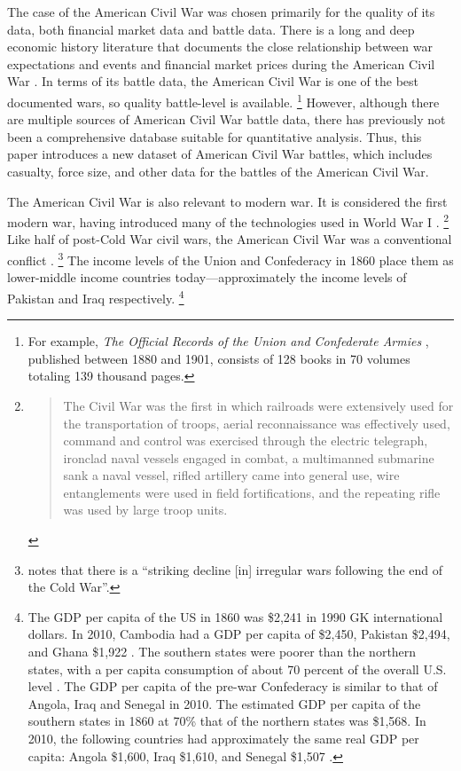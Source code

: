 \documentclass[11pt, oneside, article]{memoir}
\begin{document}
The case of the American Civil War was chosen primarily for the quality of its data, both financial market data and battle data.
There is a long and deep economic history literature that documents the close relationship between war expectations and events and financial market prices during the American Civil War \parencites{Mitchell1903}{Mitchell1908}{Calomiris1988}{WillardGuinnaneEtAl1996}{McCandless1996}{SmithSmith1997}{Schwab1901}{Weidenmier2002}{BurdekinLangdana1993}{DavisPecquet1990}{BrownBurdekin2000}{OosterlinckWeidenmier2007}{Roll1972}.
In terms of its battle data, the American Civil War is one of the best documented wars, so quality battle-level is available.%
\footnote{%
  For example, \textit{The Official Records of the Union and  Confederate Armies} \parencites{US1901}, published between 1880 and 1901, consists of 128 books in 70 volumes totaling 139 thousand pages. %
} %
However, although there are multiple sources of American Civil War battle data, there has previously not been a comprehensive database suitable for quantitative analysis. 
Thus, this paper introduces a new dataset of American Civil War battles, which includes casualty, force size, and other data for the battles of the American Civil War.

The American Civil War is also relevant to modern war.
It is considered the first modern war, having introduced many of the technologies used in World War I \parencite[89][]{Fuller1956a}.%
\footnote{
  \begin{quotation}
    The Civil War was the first in which railroads were extensively used for the transportation of troops, aerial reconnaissance was effectively used, command and control was exercised through the electric telegraph, ironclad naval vessels engaged in combat, a multimanned submarine sank a naval vessel, rifled artillery came into general use, wire entanglements were used in field fortifications, and the repeating rifle was used by large troop units. \parencite[760]{Weiss1966}
  \end{quotation}
}
Like half of post-Cold War civil wars, the American Civil War was a conventional conflict \parencite[423]{kalyvas2010inter}.%
\footnote{
  \textcite{kalyvas2010inter} notes that there is a ``striking decline [in] irregular wars following the end of the Cold War''.
}
The income levels of the Union and Confederacy in 1860 place them as lower-middle income countries today---approximately the income levels of Pakistan and Iraq respectively.%
\footnote{%
  The GDP per capita of the US in 1860 was \$2,241 in 1990 GK international dollars. %
  In 2010, Cambodia had a GDP per capita of \$2,450, Pakistan \$2,494, and Ghana \$1,922 \parencite{BoltZanden2013}. %
  The southern states were poorer than the northern states, with a per capita consumption of about 70 percent of the overall U.S. level \parencite[324]{GoldinLewis1975}. 
  The GDP per capita of the pre-war Confederacy is similar to that of Angola, Iraq and Senegal in 2010.%
  The estimated GDP per capita of the southern states in 1860 at 70\% that of the northern states was \$1,568. %
  In 2010, the following countries had approximately the same real GDP per capita: Angola \$1,600, Iraq \$1,610, and Senegal \$1,507 \parencite{BoltZanden2013}. %
}
\end{document}
